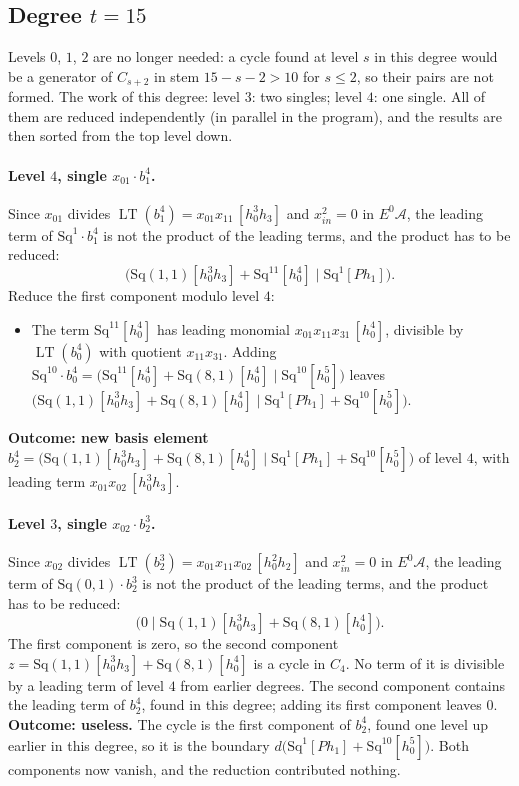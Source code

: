 \documentclass[11pt]{article}
\newcommand{\Sq}{\mathrm{Sq}}
\newcommand{\A}{\mathcal{A}}
\DeclareMathOperator{\LT}{LT}
\begin{document}
\subsection*{Degree $t = 15$}
\noindent Levels $0$, $1$, $2$ are no longer needed: a cycle found at level $s$ in this degree would be a generator of $C_{s+2}$ in stem $15-s-2 > 10$ for $s \le 2$, so their pairs are not formed.
\noindent The work of this degree: level $3$: two singles; level $4$: one single. All of them are reduced independently (in parallel in the program), and the results are then sorted from the top level down.
\medskip
\paragraph{Level $4$, single $x_{01}\cdot b^{4}_{1}$.} Since $x_{01}$ divides $\LT(b^{4}_{1}) = x_{01}x_{11}\,[h_0^3h_3]$ and $x_{in}^2 = 0$ in $E^0\A$, the leading term of $\Sq^{1}\cdot b^{4}_{1}$ is not the product of the leading terms, and the product has to be reduced:
\[\bigl(\Sq(1,1)[h_0^3h_3] + \Sq^{11}[h_0^4] \;\big|\; \Sq^{1}[Ph_1]\bigr).\]
Reduce the first component modulo level $4$:
\begin{itemize}
\item The term $\Sq^{11}[h_0^4]$ has leading monomial $x_{01}x_{11}x_{31}\,[h_0^4]$, divisible by $\LT(b^{4}_{0})$ with quotient $x_{11}x_{31}$. Adding $\Sq^{10}\cdot b^{4}_{0} = \bigl(\Sq^{11}[h_0^4] + \Sq(8,1)[h_0^4] \;\big|\; \Sq^{10}[h_0^5]\bigr)$ leaves $\bigl(\Sq(1,1)[h_0^3h_3] + \Sq(8,1)[h_0^4] \;\big|\; \Sq^{1}[Ph_1] + \Sq^{10}[h_0^5]\bigr)$.
\end{itemize}
\textbf{Outcome: new basis element} $b^{4}_{2} = \bigl(\Sq(1,1)[h_0^3h_3] + \Sq(8,1)[h_0^4] \;\big|\; \Sq^{1}[Ph_1] + \Sq^{10}[h_0^5]\bigr)$ of level $4$, with leading term $x_{01}x_{02}\,[h_0^3h_3]$.
\medskip
\paragraph{Level $3$, single $x_{02}\cdot b^{3}_{2}$.} Since $x_{02}$ divides $\LT(b^{3}_{2}) = x_{01}x_{11}x_{02}\,[h_0^2h_2]$ and $x_{in}^2 = 0$ in $E^0\A$, the leading term of $\Sq(0,1)\cdot b^{3}_{2}$ is not the product of the leading terms, and the product has to be reduced:
\[\bigl(0 \;\big|\; \Sq(1,1)[h_0^3h_3] + \Sq(8,1)[h_0^4]\bigr).\]
The first component is zero, so the second component $z = \Sq(1,1)[h_0^3h_3] + \Sq(8,1)[h_0^4]$ is a cycle in $C_{4}$.
No term of it is divisible by a leading term of level $4$ from earlier degrees.
The second component contains the leading term of $b^{4}_{2}$, found in this degree; adding its first component leaves $0$.
\textbf{Outcome: useless.} The cycle is the first component of $b^{4}_{2}$, found one level up earlier in this degree, so it is the boundary $d\bigl(\Sq^{1}[Ph_1] + \Sq^{10}[h_0^5]\bigr)$. Both components now vanish, and the reduction contributed nothing.
\medskip
\end{document}
